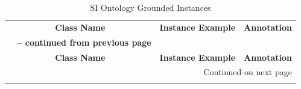 \begin{center}
\begin{longtable}{|c||c||c|}
\caption[SI Ontology Grounded Instances]{SI Ontology Grounded Instances} \label{tab:app-gi} \\

\hline \multicolumn{1}{|c||}{\textbf{Class Name}} & \multicolumn{1}{c||}{\textbf{Instance Example}} & \multicolumn{1}{c|}{\textbf{Annotation}} \\ \hhline{|=#=#=|}
\endfirsthead

\multicolumn{3}{c}%
{{\bfseries \tablename\ \thetable{} -- continued from previous page}} \\
\hline \multicolumn{1}{|c||}{\textbf{Class Name}} &
\multicolumn{1}{c||}{\textbf{Instance Example}} &
\multicolumn{1}{c|}{\textbf{Annotation}} \\ \hline 
\endhead

\hline \multicolumn{3}{|r|}{{Continued on next page}} \\ \hline
\endfoot


\end{longtable}
\end{center}
